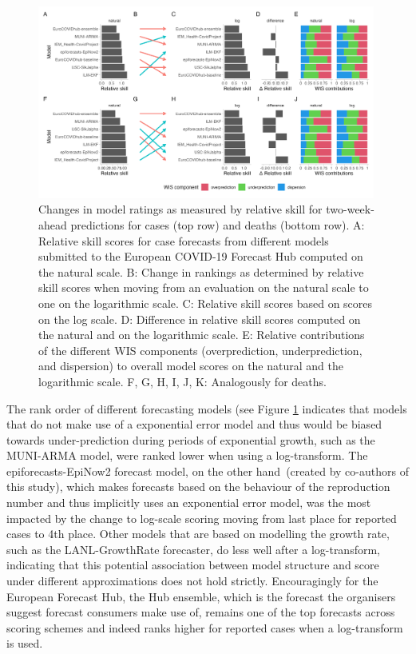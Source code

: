 \documentclass{article}
\begin{document}
\begin{figure}[h!]
    \centering
    \includegraphics[width=0.99\textwidth]{output/figures/HUB-pairwise-comparisons.png}
    \caption{Changes in model ratings as measured by relative skill for two-week-ahead predictions for cases (top row) and deaths (bottom row). A: Relative skill scores for case forecasts from different models submitted to the European COVID-19 Forecast Hub computed on the natural scale. B: Change in rankings as determined by relative skill scores when moving from an evaluation on the natural scale to one on the logarithmic scale. C: Relative skill scores based on scores on the log scale. D: Difference in relative skill scores computed on the natural and on the logarithmic scale. E: Relative contributions of the different WIS components (overprediction, underprediction, and dispersion) to overall model scores on the natural and the logarithmic scale. F, G, H, I, J, K: Analogously for deaths.}
    \label{fig:HUB-rank-order}
\end{figure}


The rank order of different forecasting models (see Figure \ref{fig:HUB-rank-order} indicates that models that do not make use of a exponential error model and thus would be biased towards under-prediction during periods of exponential growth, such as the MUNI-ARMA model, were ranked lower when using a log-transform. The epiforecasts-EpiNow2 forecast model, on the other hand~(created by co-authors of this study), which makes forecasts based on the behaviour of the reproduction number and thus implicitly uses an exponential error model, was the most impacted by the change to log-scale scoring moving from last place for reported cases to 4th place. Other models that are based on modelling the growth rate, such as the LANL-GrowthRate forecaster, do less well after a log-transform, indicating that this potential association between model structure and score under different approximations does not hold strictly. Encouragingly for the European Forecast Hub, the Hub ensemble, which is the forecast the organisers suggest forecast consumers make use of, remains one of the top forecasts across scoring schemes and indeed ranks higher for reported cases when a log-transform is used.
\end{document}
